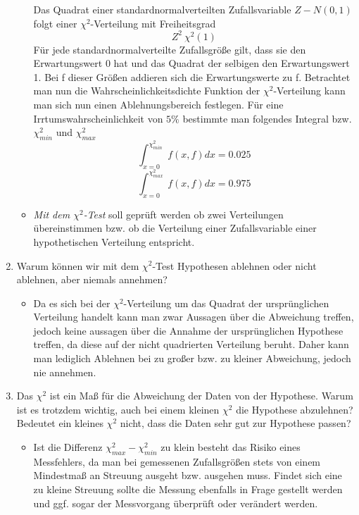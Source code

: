 \documentclass{article}
\begin{document}
\begin{enumerate}
\begin{itemize}
                    Das Quadrat einer standardnormalverteilten Zufallsvariable $Z - N(0,1)$ folgt einer $\chi^2$-Verteilung mit Freiheitsgrad
                    $$Z^2~\chi^2(1)$$
                    Für jede standardnormalverteilte Zufallsgröße gilt, dass sie den Erwartungswert 0 hat und das Quadrat der selbigen den Erwartungswert 1. Bei f 
                    dieser Größen addieren sich die Erwartungswerte zu f. Betrachtet man nun die Wahrscheinlichkeitsdichte Funktion der $\chi^2$-Verteilung kann man sich nun einen
                    Ablehnungsbereich festlegen. Für eine Irrtumswahrscheinlichkeit von $5\%$ bestimmte man folgendes Integral bzw. $\chi_{min}^2$ und $\chi_{max}^2$
                    $$\int_{x=0}^{\chi_{min}^2}f(x,f)dx = 0.025$$
                    $$\int_{x=0}^{\chi_{max}^2}f(x,f)dx = 0.975$$
                    \item \emph{Mit dem $\chi^2$-Test} soll geprüft werden ob zwei Verteilungen \newline
                    übereinstimmen bzw. ob die Verteilung einer Zufallsvariable einer hypothetischen Verteilung entspricht.   
                \end{itemize} 
            \item Warum können wir mit dem $\chi^2$-Test Hypothesen ablehnen oder nicht ablehnen, aber niemals annehmen?
                \begin{itemize}
                    \item Da es sich bei der $\chi^2$-Verteilung um das Quadrat der ursprünglichen Verteilung handelt kann man zwar Aussagen über die Abweichung treffen,
                    jedoch keine aussagen über die Annahme der ursprünglichen Hypothese treffen, da diese auf der nicht quadrierten Verteilung beruht.
                    Daher kann man lediglich Ablehnen bei zu großer bzw. zu kleiner Abweichung, jedoch nie annehmen.
                \end{itemize} 
            \item Das $\chi^2$ ist ein Maß für die Abweichung der Daten von der Hypothese. Warum ist es trotzdem wichtig, auch bei einem kleinen $\chi^2$ die 
            Hypothese abzulehnen? Bedeutet ein kleines $\chi^2$ nicht, dass die Daten sehr gut zur Hypothese passen?
                \begin{itemize}
                    \item Ist die Differenz $\chi_{max}^2 - \chi_{min}^2$ zu klein besteht das Risiko eines Messfehlers, da man bei gemessenen Zufallsgrößen stets
                    von einem Mindestmaß an Streuung ausgeht bzw. ausgehen muss. Findet sich eine zu kleine Streuung sollte die Messung ebenfalls in Frage gestellt werden
                    und ggf. sogar der Messvorgang überprüft oder verändert werden.
                \end{itemize} 
            
        \end{enumerate}
\end{document}
